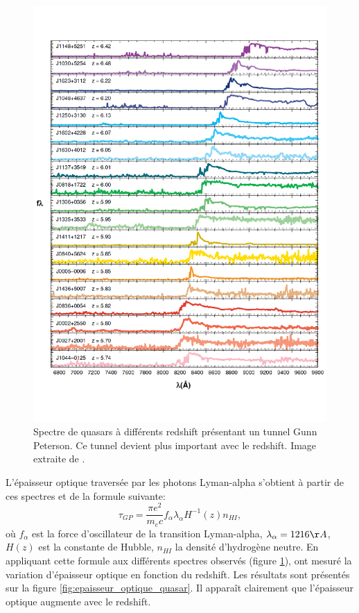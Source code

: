 
\begin{figure}
        \includegraphics[width=.95\linewidth]{img/01/quasar_spectre.pdf} 
        \caption[Spectre de quasars]{Spectre de quasars à différents redshift présentant un tunnel Gunn Peterson.
        Ce tunnel devient plus important avec le redshift.
		Image extraite de \cite{fan_constraining_2006}.
 		\label{fig:spectre_quasar}}
\end{figure}



L’épaisseur optique traversée par les photons Lyman-alpha s'obtient à partir de ces spectres et de la formule suivante:
\begin{equation}
\tau_{GP} = \frac{\pi e^2}{m_e c} f_\alpha \lambda_\alpha H^{-1}(z) n_{HI},
\end{equation}
où $f_\alpha$ est la force d'oscillateur de la transition Lyman-alpha, $\lambda_\alpha = 1216 \AA$, $H(z)$ est la constante de Hubble, $n_{HI}$ la densité d'hydrogène neutre.
En appliquant cette formule aux différents spectres observés (figure \ref{fig:spectre_quasar}), \cite{fan_constraining_2006} ont mesuré la variation d'épaisseur optique en fonction du redshift.
Les résultats sont présentés sur la figure \ref{fig:epaisseur_optique_quasar}.
Il apparaît clairement que l'épaisseur optique augmente avec le redshift.



